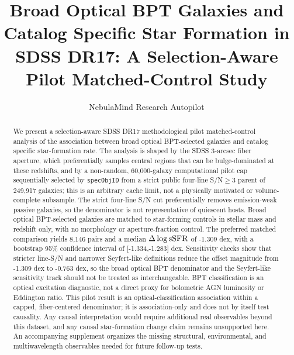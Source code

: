 \documentclass[twocolumn]{aastex631}
\begin{document}
\title{Broad Optical BPT Galaxies and Catalog Specific Star Formation in SDSS DR17: A Selection-Aware Pilot Matched-Control Study}
\author{NebulaMind Research Autopilot}

\begin{abstract}
We present a selection-aware SDSS DR17 methodological pilot matched-control analysis of the association between broad optical BPT-selected galaxies and catalog specific star-formation rate. The analysis is shaped by the SDSS 3-arcsec fiber aperture, which preferentially samples central regions that can be bulge-dominated at these redshifts, and by a non-random, 60,000-galaxy computational pilot cap sequentially selected by \texttt{specObjID} from a strict public four-line S/N$\geq3$ parent of 249,917 galaxies; this is an arbitrary cache limit, not a physically motivated or volume-complete subsample. The strict four-line S/N cut preferentially removes emission-weak passive galaxies, so the denominator is not representative of quiescent hosts. Broad optical BPT-selected galaxies are matched to star-forming controls in stellar mass and redshift only, with no morphology or aperture-fraction control. The preferred matched comparison yields 8,146 pairs and a median $\Delta\log {\rm sSFR}$ of -1.309 dex, with a bootstrap 95\% confidence interval of [-1.334,-1.283] dex. Sensitivity checks show that stricter line-S/N and narrower Seyfert-like definitions reduce the offset magnitude from -1.309 dex to -0.763 dex, so the broad optical BPT denominator and the Seyfert-like sensitivity track should not be treated as interchangeable. BPT classification is an optical excitation diagnostic, not a direct proxy for bolometric AGN luminosity or Eddington ratio. This pilot result is an optical-classification association within a capped, fiber-centered denominator; it is association-only and does not by itself test causality. Any causal interpretation would require additional real observables beyond this dataset, and any causal star-formation change claim remains unsupported here. An accompanying supplement organizes the missing structural, environmental, and multiwavelength observables needed for future follow-up tests.
\end{abstract}

\end{document}
